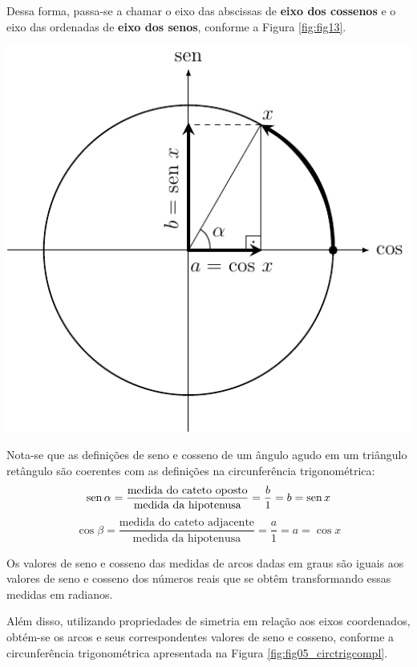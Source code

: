 Dessa forma, passa-se a chamar o eixo das abscissas de \textbf{eixo dos cossenos} e o eixo das ordenadas de \textbf{eixo dos senos}, conforme a Figura \ref{fig:fig13}.
\begin{center}
    \begin{minipage}{7cm}
        \centering
            \includegraphics[width=1.2\textwidth]{Imagens/fig13.pdf}
            \label{fig:fig13}
    \end{minipage}
\end{center}

Nota-se que as definições de seno e cosseno de um ângulo agudo em um triângulo retângulo são coerentes com as definições na circunferência trigonométrica:
\[
\operatorname{sen} \alpha = \dfrac{\text{medida do cateto oposto}}{\text{medida da hipotenusa}} = \dfrac{b}{1} = b = \operatorname{sen} x
\]
\[
\cos \beta = \dfrac{\text{medida do cateto adjacente}}{\text{medida da hipotenusa}} = \dfrac{a}{1} = a = \cos x
\]

Os valores de seno e cosseno das medidas de arcos dadas em graus são iguais aos valores de seno e cosseno dos números reais que se obtêm transformando essas medidas em radianos.

Além disso, utilizando propriedades de simetria em relação aos eixos coordenados, obtém-se os arcos e seus correspondentes valores de seno e cosseno, conforme a circunferência trigonométrica apresentada na Figura \ref{fig:fig05_circtrigcompl}.

